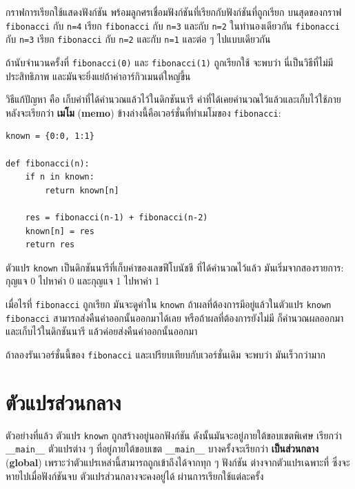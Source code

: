 กราฟการเรียกใช้แสดงฟังก์ชัน พร้อมลูกศรเชื่อมฟังก์ชันที่เรียกกับฟังก์ชันที่ถูกเรียก
บนสุดของกราฟ \texttt{fibonacci} กับ \texttt{n=4} เรียก
\texttt{fibonacci} กับ \texttt{n=3} และกับ \texttt{n=2}  
ในทำนองเดียวกัน \texttt{fibonacci} กับ \texttt{n=3} เรียก
\texttt{fibonacci} กับ \texttt{n=2} และกับ \texttt{n=1}  
และต่อ ๆ ไปแบบเดียวกัน

ถ้านับจำนวนครั้งที่ \texttt{fibonacci(0)} และ \texttt{fibonacci(1)} ถูกเรียกใช้
จะพบว่า นี่เป็นวิธีที่ไม่มีประสิทธิภาพ และมันจะยิ่งแย่ถ้าค่าอาร์กิวเมนต์ใหญ่ขึ้น

วิธีแก้ปัญหา คือ เก็บค่าที่ได้คำนวณแล้วไว้ในดิกชันนารี
ค่าที่ได้เคยคำนวณไว้แล้วและเก็บไว้ใช้ภายหลังจะเรียกว่า \textbf{เมโม} (\textbf{memo})
ข้างล่างนี้คือเวอร์ชั่นที่ทำเมโมของ \texttt{fibonacci}:

\begin{verbatim}
known = {0:0, 1:1}

def fibonacci(n):
    if n in known:
        return known[n]

    res = fibonacci(n-1) + fibonacci(n-2)
    known[n] = res
    return res
\end{verbatim}
%
ตัวแปร \texttt{known} เป็นดิกชันนารีที่เก็บค่าของเลขฟีโบนัชชี ที่ได้คำนวณไว้แล้ว
มันเริ่มจากสองรายการ: กุญแจ 0 ไปหาค่า 0 และกุญแจ 1 ไปหาค่า 1

เมื่อไรที่ \texttt{fibonacci} ถูกเรียก
มันจะดูค่าใน \texttt{known}
ถ้าผลที่ต้องการมีอยู่แล้วในตัวแปร \texttt{known}
\texttt{fibonacci} สามารถส่งคืนค่าออกนั้นออกมาได้เลย
หรือถ้าผลที่ต้องการยังไม่มี ก็คำนวณผลออกมา และเก็บไว้ในดิกชันนารี แล้วค่อยส่งคืนค่าออกนั้นออกมา

ถ้าลองรันเวอร์ชั่นนี้ของ \texttt{fibonacci} และเปรียบเทียบกับเวอร์ชั่นเดิม
จะพบว่า มันเร็วกว่ามาก

\section{ตัวแปรส่วนกลาง}

ตัวอย่างที่แล้ว ตัวแปร \texttt{known} ถูกสร้างอยู่นอกฟังก์ชัน
ดังนั้นมันจะอยู่ภายใต้ขอบเขตพิเศษ เรียกว่า \verb"__main__"
ตัวแปรต่าง ๆ ที่อยู่ภายใต้ขอบเขต \verb"__main__" บางครั้งจะเรียกว่า \textbf{เป็นส่วนกลาง} (\textbf{global})
เพราะว่าตัวแปรเหล่านี้สามารถถูกเข้าถึงได้จากทุก ๆ ฟังก์ชัน
ต่างจากตัวแปรเฉพาะที่ ซึ่งจะหายไปเมื่อฟังก์ชันจบ
ตัวแปรส่วนกลางจะคงอยู่ได้ ผ่านการเรียกใช้แต่ละครั้ง

